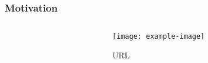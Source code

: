 \documentclass[aspectratio=43,10pt]{beamer}
\begin{document}
\begin{frame}[t]
\frametitle{\textbf{Motivation}}
\begin{columns}[T]
\begin{column}{.6\textwidth}
\begin{itemize}
\uncover<+->{\item }
\end{itemize}
\end{column}
\begin{column}{.4\textwidth}
\centering
\begin{figure}%
\texttt{[image: example-image]}
\caption{\tiny URL}
\end{figure} 
\end{column}
\end{columns}
\end{frame}
\end{document}
